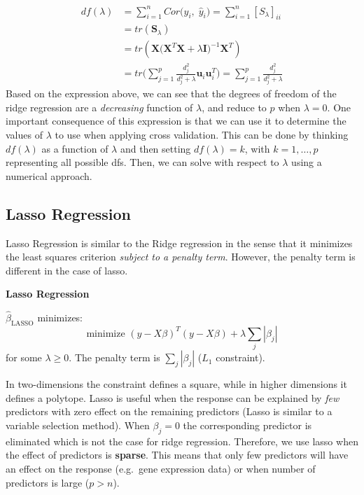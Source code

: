 \documentclass[
]{book}
\begin{document}
\begin{align*}
df(\lambda) &= \sum_{i=1}^{n} Cor \bigl(y_i,\; \hat{y}_i \bigr) = \sum_{i=1}^{n} [S_{\lambda}]_{ii}\\
&= tr(\mathbf{S}_{\lambda}) \\
&=  tr(\mathbf{X} \bigl(\mathbf{X}^T \mathbf{X} + \lambda \mathbf{I} \bigr)^{-1} \mathbf{X}^T)\\
&= tr\Biggl( \sum_{j=1}^{p} \frac{d_j^2}{d_j^2 + \lambda} \mathbf{u}_i \mathbf{u}_i^T\Biggr) =  \sum_{j=1}^{p} \frac{d_j^2}{d_j^2 + \lambda}   
\end{align*}
Based on the expression above, we can see that the degrees of freedom of the ridge regression are a \emph{decreasing} function of \(\lambda\), and reduce to \(p\) when \(\lambda = 0\). One important consequence of this expression is that we can use it to determine the values of \(\lambda\) to use when applying cross validation. This can be done by thinking \(df(\lambda)\) as a function of \(\lambda\) and then setting \(df(\lambda)=k\), with \(k=1, \ldots, p\) representing all possible dfs. Then, we can solve with respect to \(\lambda\) using a numerical approach.

\subsection{Lasso Regression}\label{lasso-regression}

Lasso Regression is similar to the Ridge regression in the sense that it minimizes the least squares criterion \emph{subject to a penalty term}. However, the penalty term is different in the case of lasso.

\textbf{Lasso Regression}

\(\hat{\beta}_{\text{LASSO}}\) minimizes:
\[\text{minimize } (y-X \beta)^T (y-X\beta) + \lambda \sum_j |\beta_j|\]
for some \(\lambda \ge 0\). The penalty term is \(\sum_j |\beta_j|\) (\(L_1\) constraint).

In two-dimensions the constraint defines a square, while in higher dimensions it defines a polytope. Lasso is useful when the response can be explained by \emph{few} predictors with zero effect on the remaining predictors (Lasso is similar to a variable selection method). When \(\beta_j=0\) the corresponding predictor is eliminated which is not the case for ridge regression. Therefore, we use lasso when the effect of predictors is \textbf{sparse}. This means that only few predictors will have an effect on the response (e.g.~gene expression data) or when number of predictors is large (\(p>n\)).
\end{document}
